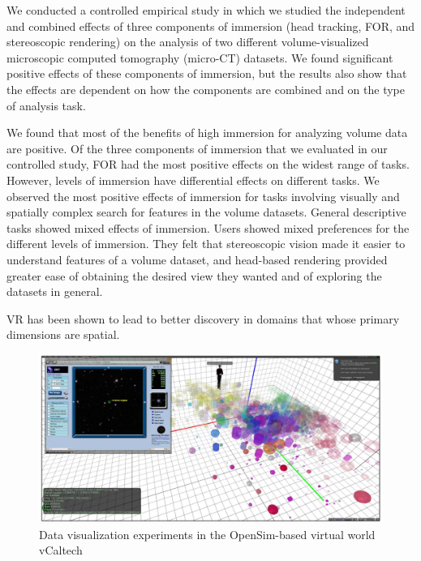 We conducted a controlled empirical study in which we studied the independent and combined effects of three components of immersion (head tracking, FOR, and stereoscopic rendering) on the analysis of two different volume-visualized microscopic computed tomography (micro-CT) datasets. We found significant positive effects of these components of immersion, but the results also show that the effects are dependent on how the components are combined and on the type of analysis task.
\cite{Laha2012}

We found that most of the benefits of high immersion for analyzing volume data are positive. Of the three components of immersion that we evaluated in our controlled study, FOR had the most positive effects on the widest range of tasks. However, levels of immersion have differential effects on different tasks. We observed the most positive effects of immersion for tasks involving visually and spatially complex search for features in the volume datasets. General descriptive tasks showed mixed effects of immersion. Users showed mixed preferences for the different levels of immersion. They felt that stereoscopic vision made it easier to understand features of a volume dataset, and head-based rendering provided greater ease of obtaining the desired view they wanted and of exploring the datasets in general.
\cite{Laha2012}

VR has been shown to lead to better discovery in domains that whose primary dimensions are spatial.
\cite{Donalek2014}

\begin{figure}[h]
	\begin{center}
		\includegraphics[width=14cm]{03_Figures/05_LitReview/Donalek2014_Caltech.png}
		\caption[Data visualization experiments in the OpenSim-based virtual world vCaltech]{Data visualization experiments in the OpenSim-based virtual world vCaltech \citep{Donalek2014}}
		\label{fig:caltechsim}
	\end{center}
\end{figure}

